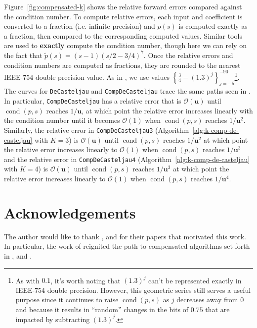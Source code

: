\documentclass[3p, authoryear, square]{elsarticle}
\theoremstyle{definition}
\newcommand{\cond}[1]{\operatorname{cond}\left(#1\right)}
\newcommand{\bigO}[1]{\mathcal{O}\left(#1\right)}
\newcommand{\mach}{\mathbf{u}}
\begin{document}
Figure~\ref{fig:compensated-k} shows the relative forward errors compared
against the condition number. To compute relative errors, each input and
coefficient is converted to a fraction (i.e. infinite precision) and
\(p(s)\) is computed exactly as a fraction, then
compared to the corresponding computed values. Similar tools are used to
\textbf{exactly} compute the condition number, though here we can rely
on the fact that \(\widetilde{p}(s) = (s - 1)
\left(s/2 - 3/4\right)^7\). Once the relative errors and
condition numbers are computed as fractions, they are rounded to the
nearest IEEE-754 double precision value. As in \cite{Jiang2010}, we use
values \(\left\{\frac{3}{4} - (1.3)^j\right\}_{j=-5}^{-90}\)\footnote{As with
\(0.1\), it's worth noting that \((1.3)^j\) can't be represented exactly in
IEEE-754 double precision. However, this geometric series still serves a
useful purpose since it continues to raise \(\cond{p, s}\) as \(j\) decreases
away from \(0\) and because it results in ``random'' changes in the bits of
\(0.75\) that are impacted by subtracting \((1.3)^j\).}. The curves for
\texttt{DeCasteljau} and \texttt{CompDeCasteljau} trace the same paths seen
in \cite{Jiang2010}. In particular, \texttt{CompDeCasteljau} has a relative
error that is \(\bigO{\mach}\) until \(\cond{p, s}\) reaches
\(1 / \mach\), at which point the relative error increases linearly with
the condition number until it becomes \(\bigO{1}\) when
\(\cond{p, s}\) reaches \(1 / \mach^2\).
Similarly, the relative error in \texttt{CompDeCasteljau3}
(Algorithm~\ref{alg:k-comp-de-casteljau} with \(K = 3\))
is \(\bigO{\mach}\) until \(\cond{p, s}\) reaches
\(1 / \mach^2\) at which point the relative error increases linearly
to \(\bigO{1}\) when \(\cond{p, s}\) reaches \(1 / \mach^3\)
and the relative error in \texttt{CompDeCasteljau4}
(Algorithm~\ref{alg:k-comp-de-casteljau} with \(K = 4\))
is \(\bigO{\mach}\) until \(\cond{p, s}\) reaches
\(1 / \mach^3\) at which point the relative error increases linearly
to \(\bigO{1}\) when \(\cond{p, s}\) reaches \(1 / \mach^4\).

\section{Acknowledgements}

The author would like to thank \cite{Ogita2005}, \cite{Graillat2009} and
\cite{Jiang2010} for their papers that motivated this work. In particular,
the work of \cite{Ogita2005} reignited the path to compensated algorithms set
forth in \cite{Babuska1968}, \cite{Knuth1969} and \cite{Dekker1971}.
\end{document}
